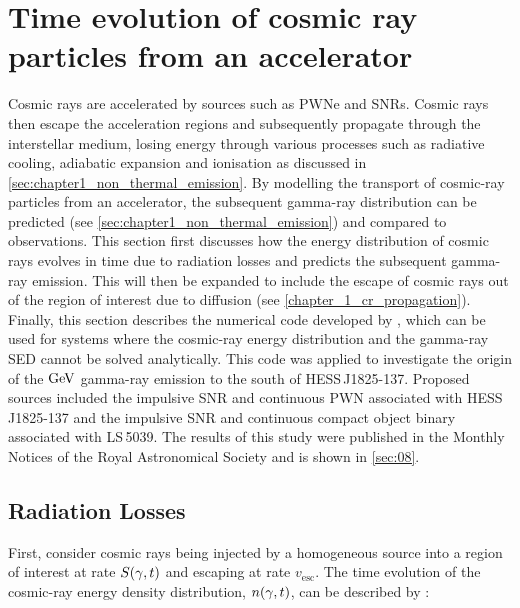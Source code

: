 \chapter[Time evolution of CR particles]{Time evolution of cosmic ray particles from an accelerator} \label{sec:07_particle_ev}

Cosmic rays are accelerated by sources such as PWNe and SNRs. Cosmic rays then escape the acceleration regions and subsequently propagate through the interstellar medium, losing energy through various processes such as radiative cooling, adiabatic expansion and ionisation as discussed in \autoref{sec:chapter1_non_thermal_emission}. By modelling the transport of cosmic-ray particles from an accelerator, the subsequent gamma-ray distribution can be predicted (see \autoref{sec:chapter1_non_thermal_emission}) and compared to observations.
\newpar
This section first discusses how the energy distribution of cosmic rays evolves in time due to radiation losses and predicts the subsequent gamma-ray emission. This will then be expanded to include the escape of cosmic rays out of the region of interest due to diffusion (see \autoref{chapter_1_cr_propagation}). Finally, this section describes the numerical code developed by \cite{fabien}, which can be used for systems where the cosmic-ray energy distribution and the gamma-ray SED cannot be solved analytically.
\newpar
This code was applied to investigate the origin of the $\si{\giga\electronvolt}$ gamma-ray emission to the south of \mbox{HESS\,J1825-137}. Proposed sources included the impulsive SNR and continuous PWN associated with \mbox{HESS\,J1825-137} and the impulsive SNR and continuous compact object binary associated with \mbox{LS\,5039}. The results of this study were published in the Monthly Notices of the Royal Astronomical Society and is shown in \autoref{sec:08}.

\section{Radiation Losses} \label{sec:chapter_7_cr_SED_evol} 

First, consider cosmic rays being injected by a homogeneous source into a region of interest at rate $S\qty(\gamma,t)$ and escaping at rate $v_\text{esc}$. The time evolution of the cosmic-ray energy density distribution, $n\qty(\gamma,t)$, can be described by \citep{1980gbs..bookR....M}:

